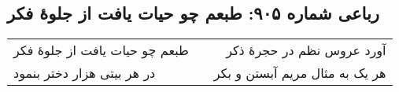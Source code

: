 \begin{center}
\section*{رباعی شماره ۹۰۵: طبعم چو حیات یافت از جلوهٔ فکر}
\label{sec:0905}
\begin{longtable}{l p{0.5cm} r}
طبعم چو حیات یافت از جلوهٔ فکر
&&
آورد عروس نظم در حجرهٔ ذکر
\\
در هر بیتی هزار دختر بنمود
&&
هر یک به مثال مریم آبستن و بکر
\\
\end{longtable}
\end{center}
